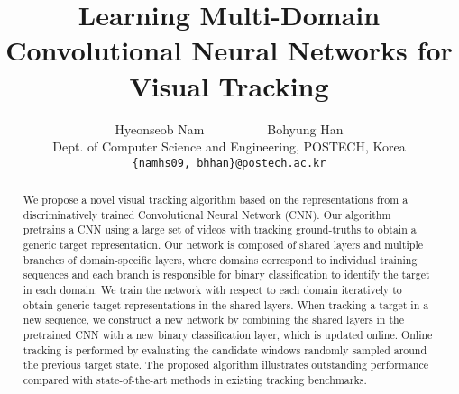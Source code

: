\documentclass[10pt,twocolumn,letterpaper]{article}
\begin{document}
\title{Learning Multi-Domain Convolutional Neural Networks for Visual Tracking}

\author{Hyeonseob Nam~~~~~~~~~~Bohyung Han\\
Dept. of Computer Science and Engineering, POSTECH, Korea\\
{\tt\small \{namhs09, bhhan\}@postech.ac.kr}
}

\maketitle

\begin{abstract}
We propose a novel visual tracking algorithm based on the representations from a discriminatively trained Convolutional Neural Network (CNN). 
Our algorithm pretrains a CNN using a large set of videos with tracking ground-truths to obtain a generic target representation. 
Our network is composed of shared layers and multiple branches of domain-specific layers, where domains correspond to individual training sequences and each branch is responsible for binary classification to identify the target in each domain.
We train the network with respect to each domain iteratively to obtain generic target representations in the shared layers. 
When tracking a target in a new sequence, we construct a new network by combining the shared layers in the pretrained CNN with a new binary classification layer, which is updated online.
Online tracking is performed by evaluating the candidate windows randomly sampled around the previous target state. 
The proposed algorithm illustrates outstanding performance compared with state-of-the-art methods in existing tracking benchmarks.
\end{abstract}

\end{document}
